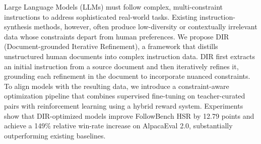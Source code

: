 Large Language Models (LLMs) must follow complex, multi-constraint instructions to address sophisticated real-world tasks. Existing instruction-synthesis methods, however, often produce low-diversity or contextually irrelevant data whose constraints depart from human preferences. We propose DIR (Document-grounded Iterative Refinement), a framework that distills unstructured human documents into complex instruction data. DIR first extracts an initial instruction from a source document and then iteratively refines it, grounding each refinement in the document to incorporate nuanced constraints. To align models with the resulting data, we introduce a constraint-aware optimization pipeline that combines supervised fine-tuning on teacher-curated pairs with reinforcement learning using a hybrid reward system. Experiments show that DIR-optimized models improve FollowBench HSR by 12.79 points and achieve a 149\% relative win-rate increase on AlpacaEval 2.0, substantially outperforming existing baselines.